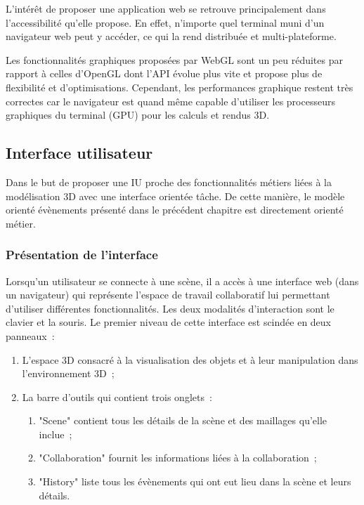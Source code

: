 L'intérêt de proposer une application web se retrouve principalement dans 
l'accessibilité qu'elle propose. En effet, n'importe quel terminal muni d'un 
navigateur web peut y accéder, ce qui la rend distribuée et multi-plateforme. 

Les fonctionnalités graphiques proposées par 
WebGL sont un peu réduites par rapport à celles d'OpenGL dont l'\gls{API} évolue 
plus vite et propose plus de flexibilité et d'optimisations. Cependant, les 
performances graphique restent très correctes car le navigateur est quand même 
capable d'utiliser les processeurs graphiques du terminal (GPU) pour les calculs et 
rendus 3D.
\subsection{Interface utilisateur}
Dans le but de proposer une \gls{IU} proche des fonctionnalités métiers liées à la 
modélisation 3D avec une interface orientée tâche. De cette manière, le modèle 
orienté évènements présenté dans le précédent chapitre est directement orienté 
métier.
\subsubsection{Présentation de l'interface}

Lorsqu'un utilisateur se connecte à une scène, il a accès à une interface web 
(dans un navigateur) qui représente l'espace de travail collaboratif lui permettant 
d'utiliser différentes fonctionnalités. Les deux modalités d'interaction sont le clavier 
et la souris. Le premier niveau de cette 
interface est scindée en deux panneaux~: 
\begin{enumerate}
	\item L'espace 3D consacré à la visualisation des objets et à leur manipulation 
	dans l'environnement 3D~;
	\item La barre d'outils qui contient trois onglets~:~
	\begin{enumerate}
		\item "Scene" contient tous les détails de la scène et des maillages qu'elle 
		inclue~; 
		\item "Collaboration" fournit les informations liées à la collaboration~;
		\item "History" liste tous les évènements qui ont eut lieu dans la scène et 
		leurs  détails. 
	\end{enumerate}
\end{enumerate}

